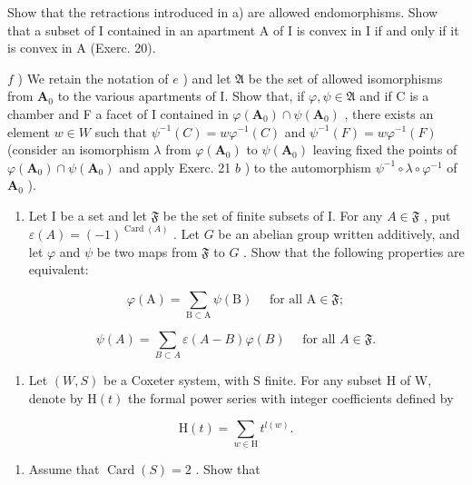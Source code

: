Show that the retractions introduced in a) are allowed endomorphisms. Show that a subset of I contained in an apartment A of I is convex in I if and only if it is convex in A (Exerc. 20).

\(f\) ) We retain the notation of \(e\) ) and let \(\mathfrak{A}\) be the set of allowed isomorphisms from \(\mathbf{A}_0\) to the various apartments of I. Show that, if \(\varphi, \psi \in \mathfrak{A}\) and if C is a chamber and F a facet of I contained in \(\varphi(\mathbf{A}_0) \cap \psi(\mathbf{A}_0)\) , there exists an element \(w \in W\) such that \(\psi^{-1}(C) = w\varphi^{-1}(C)\) and \(\psi^{-1}(F) = w\varphi^{-1}(F)\) (consider an isomorphism \(\lambda\) from \(\varphi(\mathbf{A}_0)\) to \(\psi(\mathbf{A}_0)\) leaving fixed the points of \(\varphi(\mathbf{A}_0) \cap \psi(\mathbf{A}_0)\) and apply Exerc. 21 \(b\) ) to the automorphism \(\psi^{-1} \circ \lambda \circ \varphi^{-1}\) of \(\mathbf{A}_0\) ).

\begin{enumerate}
\def\labelenumi{\arabic{enumi})}
\setcounter{enumi}{24}
\tightlist
\item
  Let I be a set and let \(\mathfrak{F}\) be the set of finite subsets of I. For any \(A \in \mathfrak{F}\) , put \(\varepsilon(A) = (-1)^{\operatorname{Card}(A)}\) . Let \(G\) be an abelian group written additively, and let \(\varphi\) and \(\psi\) be two maps from \(\mathfrak{F}\) to \(G\) . Show that the following properties are equivalent:
\end{enumerate}

\[
\varphi (\mathrm{A}) = \sum_ {\mathrm{B} \subset \mathrm{A}} \psi (\mathrm{B}) \quad \text {   for   all   } \mathrm{A} \in \mathfrak {F};\tag{i}
\]

\[
\psi (A) = \sum_ {B \subset A} \varepsilon (A - B) \varphi (B) \quad \text {   for   all   } A \in \mathfrak {F}.\tag{ii}
\]

\begin{enumerate}
\def\labelenumi{\arabic{enumi})}
\setcounter{enumi}{25}
\tightlist
\item
  Let \((W, S)\) be a Coxeter system, with S finite. For any subset H of W, denote by \(\mathrm{H}(t)\) the formal power series with integer coefficients defined by
\end{enumerate}

\[
\mathrm{H} (t) = \sum_ {w \in \mathrm{H}} t ^ {l (w)}.
\]

\begin{enumerate}
\def\labelenumi{\alph{enumi})}
\tightlist
\item
  Assume that \(\operatorname{Card}(S) = 2\) . Show that
\end{enumerate}

